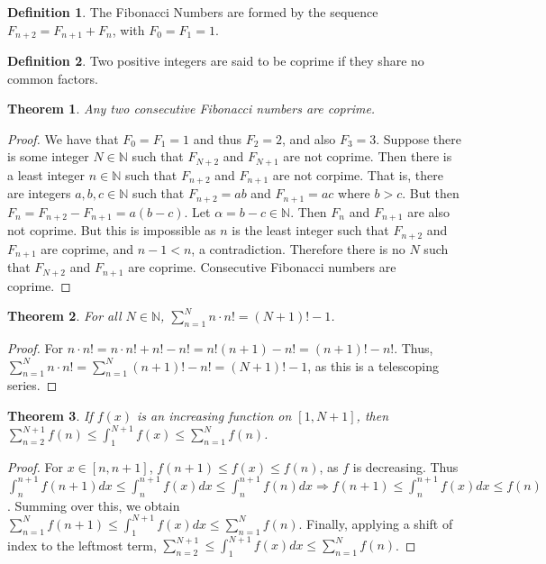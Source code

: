 \documentclass[oneside]{book}
\newtheorem{theorem}{Theorem}[section]
\theoremstyle{definition}
\newtheorem{definition}{Definition}[section]
\begin{document}
\begin{definition}
The Fibonacci Numbers are formed by the sequence $F_{n+2}=F_{n+1}+F_{n}$, with $F_0=F_1 = 1$.
\end{definition}

\begin{definition}
Two positive integers are said to be coprime if they share no common factors.
\end{definition}

\begin{theorem}
Any two consecutive Fibonacci numbers are coprime.
\end{theorem}
\begin{proof}
We have that $F_0=F_1 = 1$ and thus $F_2 = 2$, and also $F_3 = 3$. Suppose there is some integer $N\in \mathbb{N}$ such that $F_{N+2}$ and $F_{N+1}$ are not coprime. Then there is a least integer $n\in \mathbb{N}$ such that $F_{n+2}$ and $F_{n+1}$ are not corpime. That is, there are integers $a,b,c\in \mathbb{N}$ such that $F_{n+2} = ab$ and $F_{n+1} = ac$ where $b>c$. But then $F_{n} = F_{n+2} - F_{n+1} = a(b-c)$. Let $\alpha = b-c \in \mathbb{N}$. Then $F_n$ and $F_{n+1}$ are also not coprime. But this is impossible as $n$ is the least integer such that $F_{n+2}$ and $F_{n+1}$ are coprime, and $n-1<n$, a contradiction. Therefore there is no $N$ such that $F_{N+2}$ and $F_{n+1}$ are coprime. Consecutive Fibonacci numbers are coprime. 
\end{proof}

\begin{theorem}
For all $N\in \mathbb{N}$, $\sum_{n=1}^{N} n\cdot n! = (N+1)!-1$.
\end{theorem}
\begin{proof}
For $n\cdot n! = n\cdot n! + n! - n! = n!(n+1) - n!=(n+1)!-n!$. Thus, $\sum_{n=1}^{N} n\cdot n! = \sum_{n=1}^{N} (n+1)! -n! = (N+1)!-1$, as this is a telescoping series.
\end{proof}

\begin{theorem}
If $f(x)$ is an increasing function on $[1,N+1]$, then $\sum_{n=2}^{N+1} f(n) \leq \int_{1}^{N+1} f(x) \leq \sum_{n=1}^{N} f(n)$.
\end{theorem}
\begin{proof}
For $x\in [n,n+1]$, $f(n+1)\leq f(x)\leq f(n)$, as $f$ is decreasing. Thus $\int_{n}^{n+1} f(n+1)dx \leq \int_{n}^{n+1} f(x) dx \leq \int_{n}^{n+1} f(n)dx \Rightarrow f(n+1) \leq \int_{n}^{n+1}f(x)dx \leq f(n)$. Summing over this, we obtain $\sum_{n=1}^{N} f(n+1) \leq \int_{1}^{N+1} f(x) dx \leq \sum_{n=1}^{N} f(n)$. Finally, applying a shift of index to the leftmost term, $\sum_{n=2}^{N+1} \leq \int_{1}^{N+1}f(x)dx \leq \sum_{n=1}^{N} f(n)$. 
\end{proof}
\end{document}
